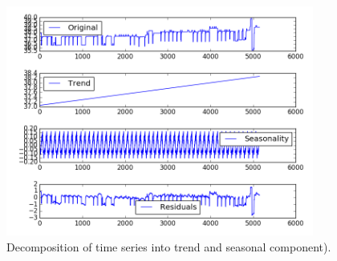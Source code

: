 \documentclass[12pt]{article}
\begin{document}
\begin{figure}
\includegraphics[width=0.9\textwidth]{11507/decomposition.png}
\caption{Decomposition of time series into trend and seasonal component).} \label{fg:decomp}
\end{figure}
\end{document}
